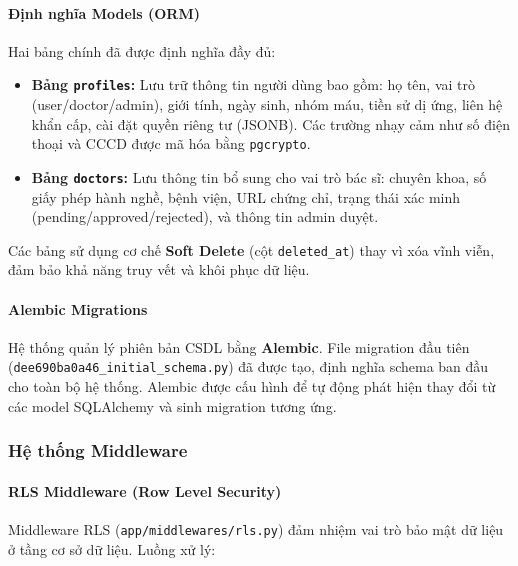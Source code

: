 \documentclass[a4paper,12pt]{article}
\begin{document}
\paragraph{Định nghĩa Models (ORM)}

Hai bảng chính đã được định nghĩa đầy đủ:

\begin{itemize}
    \item \textbf{Bảng \texttt{profiles}:} Lưu trữ thông tin người dùng bao gồm: họ tên, vai trò (user/doctor/admin), giới tính, ngày sinh, nhóm máu, tiền sử dị ứng, liên hệ khẩn cấp, cài đặt quyền riêng tư (JSONB). Các trường nhạy cảm như số điện thoại và CCCD được mã hóa bằng \texttt{pgcrypto}.
    \item \textbf{Bảng \texttt{doctors}:} Lưu thông tin bổ sung cho vai trò bác sĩ: chuyên khoa, số giấy phép hành nghề, bệnh viện, URL chứng chỉ, trạng thái xác minh (pending/approved/rejected), và thông tin admin duyệt.
\end{itemize}

Các bảng sử dụng cơ chế \textbf{Soft Delete} (cột \texttt{deleted\_at}) thay vì xóa vĩnh viễn, đảm bảo khả năng truy vết và khôi phục dữ liệu.

\paragraph{Alembic Migrations}

Hệ thống quản lý phiên bản CSDL bằng \textbf{Alembic}. File migration đầu tiên (\texttt{dee690ba0a46\_initial\_schema.py}) đã được tạo, định nghĩa schema ban đầu cho toàn bộ hệ thống. Alembic được cấu hình để tự động phát hiện thay đổi từ các model SQLAlchemy và sinh migration tương ứng.

\subsubsection{Hệ thống Middleware}

\paragraph{RLS Middleware (Row Level Security)}

Middleware RLS (\texttt{app/middlewares/rls.py}) đảm nhiệm vai trò bảo mật dữ liệu ở tầng cơ sở dữ liệu. Luồng xử lý:
\end{document}
